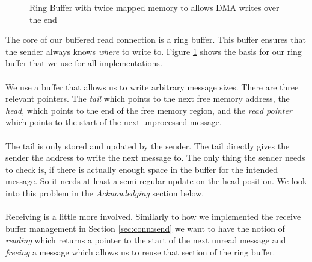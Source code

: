 \begin{figure}[!ht]
\begin{center}
\end{center}
\caption{Ring Buffer with twice mapped memory to allows DMA writes over the end}
\label{fig:ringbuffer}
\end{figure}

The core of our buffered read connection is a ring buffer. This buffer ensures that the sender always knows \emph{where} to 
write to. Figure \ref{fig:ringbuffer} shows the basis for our ring buffer that we use for all implementations.

\paragraph{} We use a buffer that allows us to write arbitrary message sizes. There are three relevant pointers. 
The \emph{tail} which points to the next free memory address, the \emph{head}, which points to  the end of the 
free memory region, and the \emph{read pointer} which points to the start of the next unprocessed message. 

\paragraph{} The tail is only stored and updated by the sender. The tail directly gives the sender the address to write the 
next message to. The only thing the sender needs to check is, if there is actually enough space in the buffer for the 
intended message. So it needs at least a semi regular update on the head position. We look into this problem in 
the \emph{Acknowledging} section below.

\paragraph{} Receiving is a little more involved. Similarly to how we implemented the receive buffer management in 
Section \ref{sec:conn:send} we want to have the notion of \emph{reading} which returns a pointer to the start of 
the next unread message and \emph{freeing} a message which allows us to reuse that section of the ring buffer. 

